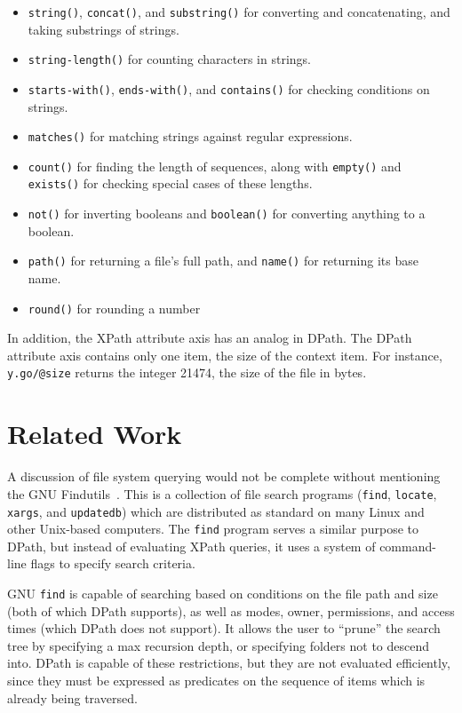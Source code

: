 \documentclass{scrartcl}
\begin{document}
\begin{itemize}
\item \texttt{string()}, \texttt{concat()}, and \texttt{substring()} for
  converting and concatenating, and taking substrings of strings.
\item \texttt{string-length()} for counting characters in strings.
\item \texttt{starts-with()}, \texttt{ends-with()}, and \texttt{contains()} for
  checking conditions on strings.
\item \texttt{matches()} for matching strings against regular expressions.
\item \texttt{count()} for finding the length of sequences, along with
  \texttt{empty()} and \texttt{exists()} for checking special cases of these
  lengths.
\item \texttt{not()} for inverting booleans and \texttt{boolean()} for
  converting anything to a boolean.
\item \texttt{path()} for returning a file's full path, and \texttt{name()} for
  returning its base name.
\item \texttt{round()} for rounding a number
\end{itemize}

In addition, the XPath attribute axis has an analog in DPath. The DPath
attribute axis contains only one item, the size of the context item. For
instance, \texttt{y.go/@size} returns the integer 21474, the size of the file in
bytes.

\section{Related Work}
\label{sec:related}

A discussion of file system querying would not be complete without mentioning
the GNU Findutils~\cite{find}. This is a collection of file search programs
(\texttt{find}, \texttt{locate}, \texttt{xargs}, and \texttt{updatedb}) which
are distributed as standard on many Linux and other Unix-based computers. The
\texttt{find} program serves a similar purpose to DPath, but instead of
evaluating XPath queries, it uses a system of command-line flags to specify
search criteria.

GNU \texttt{find} is capable of searching based on conditions on the file path
and size (both of which DPath supports), as well as modes, owner, permissions,
and access times (which DPath does not support). It allows the user to ``prune''
the search tree by specifying a max recursion depth, or specifying folders not
to descend into. DPath is capable of these restrictions, but they are not
evaluated efficiently, since they must be expressed as predicates on the
sequence of items which is already being traversed.
\end{document}
